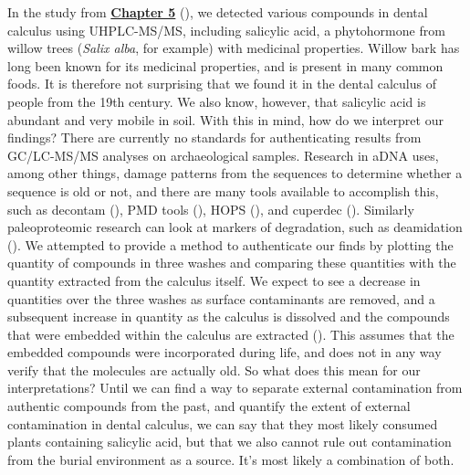 \documentclass[
  b5paper,
]{book}
\begin{document}
In the study from \hyperref[mb11CalculusPilot]{\textbf{Chapter 5}}
(), we detected various compounds in dental calculus using
UHPLC-MS/MS, including salicylic acid, a phytohormone from willow trees
(\emph{Salix alba}, for example) with medicinal properties. Willow bark
has long been known for its medicinal properties, and is present in many
common foods. It is therefore not surprising that we found it in the
dental calculus of people from the 19th century. We also know, however,
that salicylic acid is abundant and very mobile in soil. With this in
mind, how do we interpret our findings? There are currently no standards
for authenticating results from GC/LC-MS/MS analyses on archaeological
samples. Research in aDNA uses, among other things, damage patterns from
the sequences to determine whether a sequence is old or not, and there
are many tools available to accomplish this, such as decontam
(), PMD tools
(), HOPS (), and cuperdec (). Similarly paleoproteomic research can look at
markers of degradation, such as deamidation
().
We attempted to provide a method to authenticate our finds by plotting
the quantity of compounds in three washes and comparing these quantities
with the quantity extracted from the calculus itself. We expect to see a
decrease in quantities over the three washes as surface contaminants are
removed, and a subsequent increase in quantity as the calculus is
dissolved and the compounds that were embedded within the calculus are
extracted (). This assumes that the embedded compounds
were incorporated during life, and does not in any way verify that the
molecules are actually old. So what does this mean for our
interpretations? Until we can find a way to separate external
contamination from authentic compounds from the past, and quantify the
extent of external contamination in dental calculus, we can say that
they most likely consumed plants containing salicylic acid, but that we
also cannot rule out contamination from the burial environment as a
source. It's most likely a combination of both.
\end{document}
